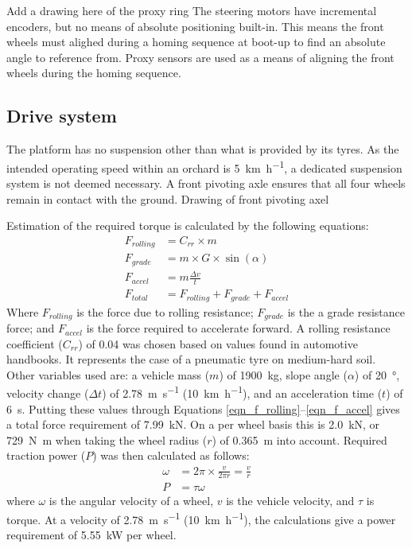 \documentclass[preprint,authoryear,12pt]{elsarticle}
\begin{document}
        \color{red} Add a drawing here of the proxy ring\color{black}
        The steering motors have incremental encoders, but no means of absolute positioning built-in.
        This means the front wheels must alighed during a homing sequence at boot-up to find an absolute angle to reference from.
        Proxy sensors are used as a means of aligning the front wheels during the homing sequence.

    \subsection{Drive system}
    \label{sub:drive}

        The platform has no suspension other than what is provided by its tyres.
        As the intended operating speed within an orchard is \SI{5}{\kilo\meter\per\hour}, a dedicated suspension system is not deemed necessary.
        A front pivoting axle ensures that all four wheels remain in contact with the ground.
        \color{red} Drawing of front pivoting axel\color{black}

        Estimation of the required torque is calculated by the following equations:
        \begin{align}
        \label{eqn_f_rolling}
        F_{rolling} &= C_{rr} \times m\\
        F_{grade} &= m \times G \times \sin(\alpha)\\
        F_{accel} &= m \frac{\Delta v}{t}\\
        \label{eqn_f_accel}
        F_{total} &= F_{rolling} + F_{grade} + F_{accel}
        \end{align}
        Where $F_{rolling}$ is the force due to rolling resistance; $F_{grade}$ is the a grade resistance force; and $F_{accel}$ is the force required to accelerate forward.
        A rolling resistance coefficient ($C_{rr}$) of 0.04 was chosen based on values found in automotive handbooks.
        It represents the case of a pneumatic tyre on medium-hard soil.
        Other variables used are: a vehicle mass ($m$) of \SI{1900}{\kilo\gram}, slope angle ($\alpha$) of \SI{20}{\degree}, velocity change ($\Delta t$) of \SI{2.78}{\metre\per\second} (\SI{10}{\kilo\meter\per\hour}), and an acceleration time ($t$) of \SI{6}{\second}.
        Putting these values through Equations \ref{eqn_f_rolling}--\ref{eqn_f_accel} gives a total force requirement of \SI{7.99}{\kilo\newton}.
        On a per wheel basis this is \SI{2.0}{\kilo\newton}, or \SI{729}{\newton\meter} when taking the wheel radius ($r$) of \SI{0.365}{\meter} into account.
        Required traction power ($P$) was then calculated as follows:
        \begin{align}
        \label{eqn_f_power}
        \omega &= 2 \pi \times \frac{v}{2 \pi r} = \frac{v}{r}\\
        P &= \tau \omega
        \end{align}
        where $\omega$ is the angular velocity of a wheel, $v$ is the vehicle velocity, and $\tau$ is torque.
        At a velocity of \SI{2.78}{\meter\per\second} (\SI{10}{\kilo\meter\per\hour}), the calculations give a power requirement of \SI{5.55}{\kilo\watt} per wheel.
\end{document}
